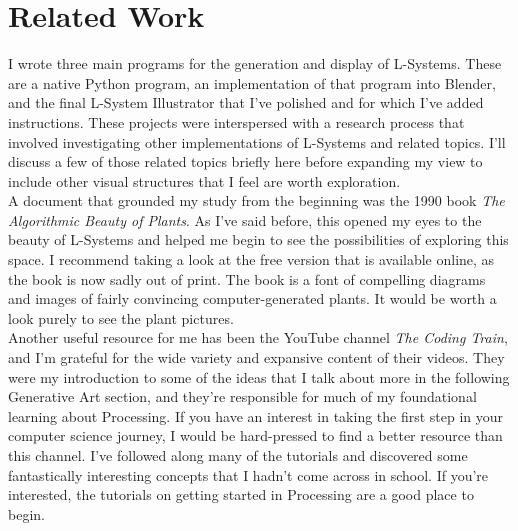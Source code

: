 \documentclass[12pt,twoside]{reedthesis}
\begin{document}
\section{Related Work}
	I wrote three main programs for the generation and display of L-Systems. These are a native Python program, an implementation of that program into Blender, and the final L-System Illustrator that I've polished and for which I've added instructions. These projects were interspersed with a research process that involved investigating other implementations of L-Systems and related topics. I'll discuss a few of those related topics briefly here before expanding my view to include other visual structures that I feel are worth exploration.\\

	A document that grounded my study from the beginning was the 1990 book \textit{The Algorithmic Beauty of Plants}. As I've said before, this opened my eyes to the beauty of L-Systems and helped me begin to see the possibilities of exploring this space. I recommend taking a look at the free version that is available online, as the book is now sadly out of print. The book is a font of compelling diagrams and images of fairly convincing computer-generated plants. It would be worth a look purely to see the plant pictures.\\
	
	Another useful resource for me has been the YouTube channel \textit{The Coding Train}, and I'm grateful for the wide variety and expansive content of their videos. They were my introduction to some of the ideas that I talk about more in the following Generative Art section, and they're responsible for much of my foundational learning about Processing. If you have an interest in taking the first step in your computer science journey, I would be hard-pressed to find a better resource than this channel. I've followed along many of the tutorials and discovered some fantastically interesting concepts that I hadn't come across in school. If you're interested, the tutorials on getting started in Processing are a good place to begin.\\
	
\end{document}
